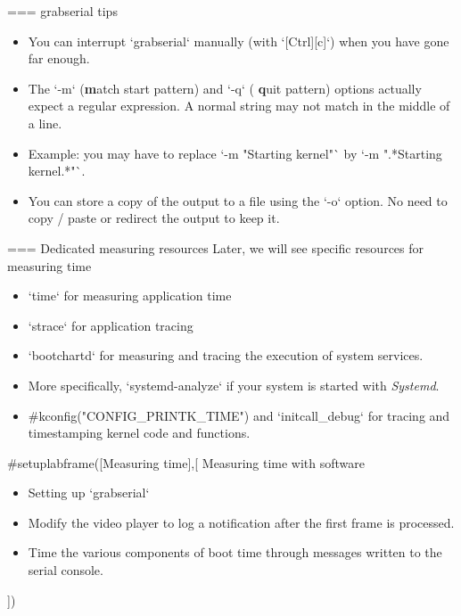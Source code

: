 === grabserial tips
\begin{itemize}
  \item You can interrupt `grabserial` manually (with
  `[Ctrl][c]`) when you have gone far enough.
  \item The `-m` ({\bf m}atch start pattern) and `-q` ({\bf
  q}uit pattern) options actually expect a regular expression.
  A normal string may not match in the middle of a line.
  \item Example: you may have to replace `-m "Starting kernel"` by
  `-m ".*Starting kernel.*"`.
  \item You can store a copy of the output to a file using the `-o`
        option. No need to copy / paste or redirect the output to keep it.
\end{itemize}


=== Dedicated measuring resources Later, we will see specific resources for measuring time
\begin{itemize}
  \item `time` for measuring application time
  \item `strace` for application tracing
  \item `bootchartd` for measuring and tracing the execution of system services.
  \item More specifically, `systemd-analyze` if your system
	is started with {\em Systemd}.
  \item #kconfig("CONFIG_PRINTK_TIME") and `initcall_debug` for
        tracing and timestamping kernel code and functions.
\end{itemize}


#setuplabframe([Measuring time],[
Measuring time with software
\begin{itemize}
\item Setting up `grabserial`
\item Modify the video player to log a notification
      after the first frame is processed.
\item Time the various components of boot time through messages
      written to the serial console.
\end{itemize}
])

